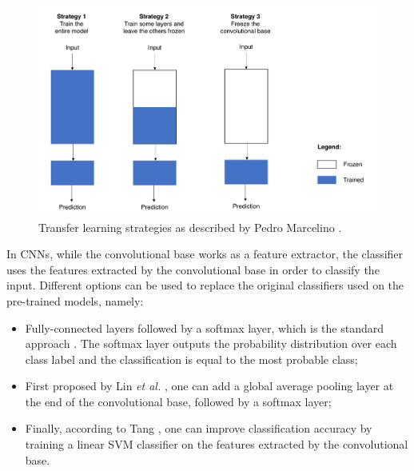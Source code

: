     \begin{figure}[ht]
      \centering
        \includegraphics[scale=0.5, width=\linewidth]{figs/transfer_learning.png}
      \caption[Transfer learning strategies]{Transfer learning strategies as described by Pedro Marcelino \cite{marctransferlearning}.}
      \label{fig:transferlearning}
    \end{figure}
    
    In \ac{CNN}s, while the convolutional base works as a feature extractor, the classifier uses the features extracted by the convolutional base in order to classify the input. Different options can be used to replace the original classifiers used on the pre-trained models, namely: 
    
    \begin{itemize}
        \item Fully-connected layers followed by a softmax layer, which is the standard approach \cite{alexnet}. The softmax layer outputs the probability distribution over each class label and the classification is equal to the most probable class;
        \item First proposed by Lin \textit{et al.} \cite{lin2013network}, one can add a global average pooling layer at the end of the convolutional base, followed by a softmax layer; 
        \item Finally, according to Tang \cite{Tang2013}, one can improve classification accuracy by training a linear \ac{SVM} classifier on the features extracted by the convolutional base. 
    \end{itemize}

